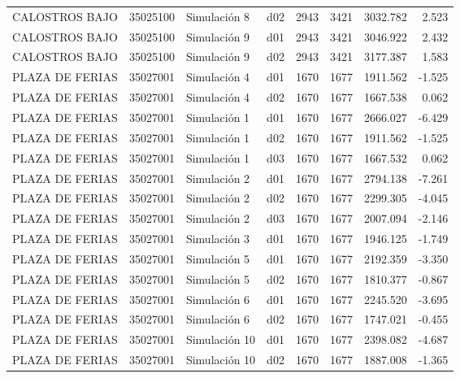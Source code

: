\begin{landscape}
\begin{longtable}{lrlp{2cm}p{2cm}p{3cm}p{2cm}r}
          CALOSTROS BAJO &  35025100 &   Simulación 8 &   d02 &      2943 &     3421 &  3032.782 &     2.523 \\
          CALOSTROS BAJO &  35025100 &   Simulación 9 &   d01 &      2943 &     3421 &  3046.922 &     2.432 \\
          CALOSTROS BAJO &  35025100 &   Simulación 9 &   d02 &      2943 &     3421 &  3177.387 &     1.583 \\
         PLAZA DE FERIAS &  35027001 &   Simulación 4 &   d01 &      1670 &     1677 &  1911.562 &    -1.525 \\
         PLAZA DE FERIAS &  35027001 &   Simulación 4 &   d02 &      1670 &     1677 &  1667.538 &     0.062 \\
         PLAZA DE FERIAS &  35027001 &   Simulación 1 &   d01 &      1670 &     1677 &  2666.027 &    -6.429 \\
         PLAZA DE FERIAS &  35027001 &   Simulación 1 &   d02 &      1670 &     1677 &  1911.562 &    -1.525 \\
         PLAZA DE FERIAS &  35027001 &   Simulación 1 &   d03 &      1670 &     1677 &  1667.532 &     0.062 \\
         PLAZA DE FERIAS &  35027001 &   Simulación 2 &   d01 &      1670 &     1677 &  2794.138 &    -7.261 \\
         PLAZA DE FERIAS &  35027001 &   Simulación 2 &   d02 &      1670 &     1677 &  2299.305 &    -4.045 \\
         PLAZA DE FERIAS &  35027001 &   Simulación 2 &   d03 &      1670 &     1677 &  2007.094 &    -2.146 \\
         PLAZA DE FERIAS &  35027001 &   Simulación 3 &   d01 &      1670 &     1677 &  1946.125 &    -1.749 \\
         PLAZA DE FERIAS &  35027001 &   Simulación 5 &   d01 &      1670 &     1677 &  2192.359 &    -3.350 \\
         PLAZA DE FERIAS &  35027001 &   Simulación 5 &   d02 &      1670 &     1677 &  1810.377 &    -0.867 \\
         PLAZA DE FERIAS &  35027001 &   Simulación 6 &   d01 &      1670 &     1677 &  2245.520 &    -3.695 \\
         PLAZA DE FERIAS &  35027001 &   Simulación 6 &   d02 &      1670 &     1677 &  1747.021 &    -0.455 \\
         PLAZA DE FERIAS &  35027001 &  Simulación 10 &   d01 &      1670 &     1677 &  2398.082 &    -4.687 \\
         PLAZA DE FERIAS &  35027001 &  Simulación 10 &   d02 &      1670 &     1677 &  1887.008 &    -1.365 \\

\end{longtable}
\end{landscape}
